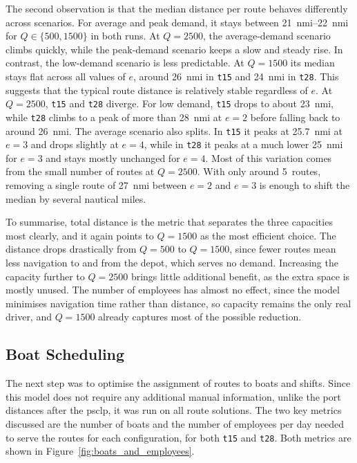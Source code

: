 \documentclass[12pt]{article}
\begin{document}
The second observation is that the median distance per route behaves differently across scenarios. For average and peak demand, it stays between \qtyrange{21}{22}{nmi} for \(Q \in \{500, 1500\}\) in both runs. At \(Q=2500\), the average-demand scenario climbs quickly, while the peak-demand scenario keeps a slow and steady rise. In contrast, the low-demand scenario is less predictable. At \(Q=1500\) its median stays flat across all values of \(e\), around \qty{26}{nmi} in \texttt{t15} and \qty{24}{nmi} in \texttt{t28}. This suggests that the typical route distance is relatively stable regardless of \(e\). At \(Q=2500\), \texttt{t15} and \texttt{t28} diverge. For low demand, \texttt{t15} drops to about \qty{23}{nmi}, while \texttt{t28} climbs to a peak of more than \qty{28}{nmi} at \(e=2\) before falling back to around \qty{26}{nmi}. The average scenario also splits. In \texttt{t15} it peaks at \qty{25.7}{nmi} at \(e=3\) and drops slightly at \(e=4\), while in \texttt{t28} it peaks at a much lower \qty{25}{nmi} for \(e=3\) and stays mostly unchanged for \(e=4\). Most of this variation comes from the small number of routes at \(Q=2500\). With only around \qty{5}{routes}, removing a single route of \qty{27}{nmi} between \(e=2\) and \(e=3\) is enough to shift the median by several nautical miles.

To summarise, total distance is the metric that separates the three capacities most clearly, and it again points to \(Q=1500\) as the most efficient choice. The distance drops drastically from \(Q=500\) to \(Q=1500\), since fewer routes mean less navigation to and from the depot, which serves no demand. Increasing the capacity further to \(Q=2500\) brings little additional benefit, as the extra space is mostly unused. The number of employees has almost no effect, since the model minimises navigation time rather than distance, so capacity remains the only real driver, and \(Q=1500\) already captures most of the possible reduction.

\subsection{Boat Scheduling}
\label{subsec:boat-scheduling}

The next step was to optimise the assignment of routes to boats and shifts. Since this model does not require any additional manual information, unlike the port distances after the \ac{psclp}, it was run on all route solutions. The two key metrics discussed are the number of boats and the number of employees per day needed to serve the routes for each configuration, for both \texttt{t15} and \texttt{t28}. Both metrics are shown in Figure~\ref{fig:boats_and_employees}.
\end{document}
